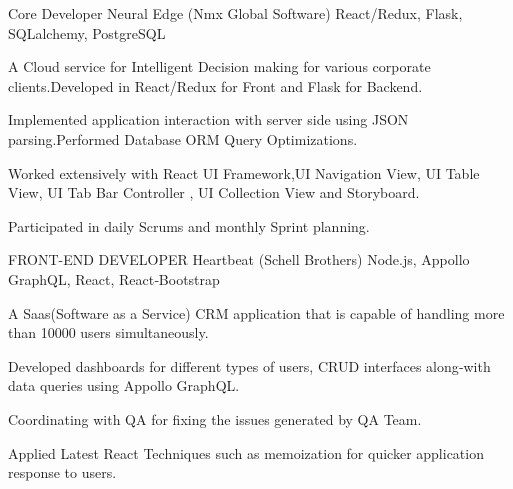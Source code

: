 

\begin{cventries}

  \cventry
    {Core Developer} %
    {Neural Edge (Nmx Global Software)} %
    {React/Redux, Flask, SQLalchemy, PostgreSQL} %
    {} %
    {
      \begin{cvitems} %
        \item {A Cloud service for Intelligent Decision making for various corporate clients.Developed in React/Redux for Front and Flask for Backend.}
        \item {Implemented application interaction with server side using JSON parsing.Performed Database ORM Query Optimizations.}
        \item {Worked  extensively with React UI Framework,UI Navigation View, UI Table View, UI Tab Bar Controller , UI Collection View and Storyboard.}
        \item {Participated in daily Scrums and monthly Sprint planning.}
      \end{cvitems}
    }

  \cventry
    {FRONT-END DEVELOPER} %
    {Heartbeat (Schell Brothers)} %
    {Node.js, Appollo GraphQL, React, React‑Bootstrap} %
    {} %
    {
      \begin{cvitems} %
        \item {A Saas(Software as a Service) CRM application that is capable of handling more than 10000 users simultaneously.}
        \item {Developed dashboards for different types of users, CRUD interfaces along‑with data queries using Appollo GraphQL.}
        \item {Coordinating with QA for fixing the issues generated by QA Team.}
        \item {Applied Latest React Techniques such as memoization for quicker application response to users.}
      \end{cvitems}
    }


\end{cventries}
